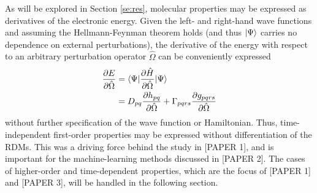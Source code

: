 As will be explored in Section \ref{se:res}, molecular properties may be expressed as 
derivatives of the electronic energy.\cite{Helgaker2012} Given the left- and right-hand wave functions 
and assuming the Hellmann-Feynman theorem\cite{Hellmann1937,Feynman1939} holds 
(and thus $| \Psi \rangle$ carries no dependence 
on external perturbations), the derivative of the energy with respect to an arbitrary 
perturbation operator 
$\hat\Omega$ can be conveniently expressed
\begin{equation} \label{eq:dE}
    \begin{aligned}
    \frac{\partial E}{\partial \hat\Omega} &= \langle\Psi |\frac{\partial \hat{H}}{\partial \hat\Omega}| \Psi \rangle\\
                                  &= D_{pq}\frac{\partial h_{pq}}{\partial \hat\Omega} + \Gamma_{pqrs}\frac{\partial g_{pqrs}}{\partial \hat\Omega}
    \end{aligned}
\end{equation}
without further specification of the wave function or Hamiltonian. 
Thus, time-independent first-order properties may be expressed without 
differentiation of the RDMs. This was a driving force behind the study in 
[PAPER 1], and is important for the machine-learning methods discussed in [PAPER 2]. The cases of 
higher-order and time-dependent properties, which are the
focus of [PAPER 1] and [PAPER 3], will be handled in the following section. 
